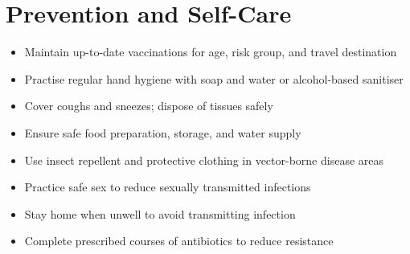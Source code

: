 \section*{Prevention and Self-Care}
\begin{itemize}
    \item Maintain up-to-date vaccinations for age, risk group, and travel destination
    \item Practise regular hand hygiene with soap and water or alcohol-based sanitiser
    \item Cover coughs and sneezes; dispose of tissues safely
    \item Ensure safe food preparation, storage, and water supply
    \item Use insect repellent and protective clothing in vector-borne disease areas
    \item Practice safe sex to reduce sexually transmitted infections
    \item Stay home when unwell to avoid transmitting infection
    \item Complete prescribed courses of antibiotics to reduce resistance
\end{itemize}
